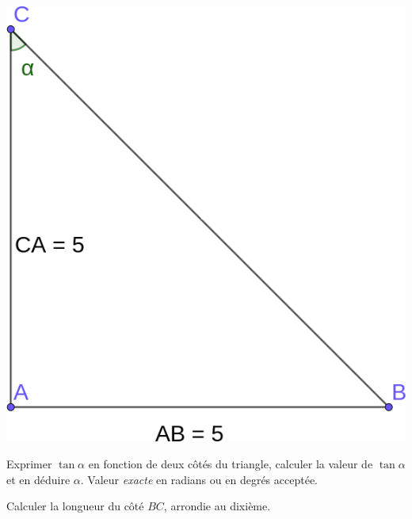 \documentclass[a4paper,12pt]{scrartcl}
\begin{document}
\begin{center}
\includegraphics[width=0.4\linewidth]{pics/Triangle.png}
\end{center}

\subquestion{}
Exprimer $\tan \alpha$ en fonction de deux côtés du triangle, calculer la valeur de $\tan \alpha$ et en déduire $\alpha$. Valeur \emph{exacte} en radians ou en degrés acceptée.



\subquestion{}
Calculer la longueur du côté $BC$, arrondie au dixième.


\end{document}
